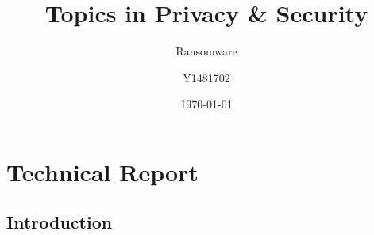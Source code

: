 \documentclass{article}
\title{Topics in Privacy \& Security}
\subtitle{Ransomware}
\author{Y1481702}
\date{\today}
\begin{document}
\begin{titlepage}
\clearpage\maketitle
\thispagestyle{empty}
\tableofcontents
\end{titlepage}



\section{Technical Report}%
\subsection{Introduction}
\end{document}
